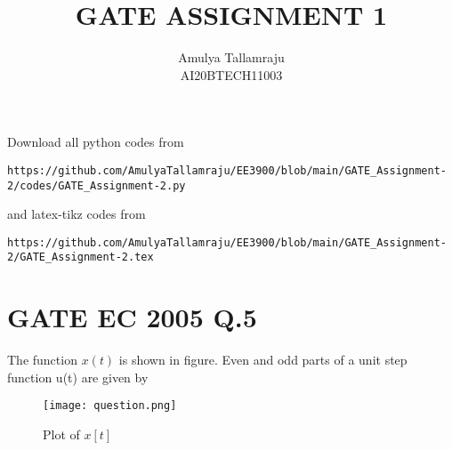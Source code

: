 \documentclass[journal,12pt,twocolumn]{IEEEtran}
\begin{document}
     \def\centbox#1{\makebox[0in]{#1}}
     \def\topbox#1{\raisebox{-\baselineskip}[0in][0in]{#1}}
     \def\midbox#1{\raisebox{-0.5\baselineskip}[0in][0in]{#1}}
\vspace{3cm}
\title{GATE ASSIGNMENT 1}
\author{Amulya Tallamraju \\ AI20BTECH11003}
\maketitle
\newpage
\bigskip
\renewcommand{\thefigure}{\theenumi}
\renewcommand{\thetable}{\theenumi}
Download all python codes from 
\begin{lstlisting}
https://github.com/AmulyaTallamraju/EE3900/blob/main/GATE_Assignment-2/codes/GATE_Assignment-2.py
\end{lstlisting}
%
and latex-tikz codes from 
%
\begin{lstlisting}
https://github.com/AmulyaTallamraju/EE3900/blob/main/GATE_Assignment-2/GATE_Assignment-2.tex
\end{lstlisting}
%
\section{GATE EC 2005 Q.5}
The function $x(t)$ is shown in figure. Even and odd parts of a unit step function u(t) are given by
\begin{figure}[!ht]
         \centering
         \texttt{[image: question.png]}
         \caption{Plot of $x[t]$}
         \label{plot}
\end{figure}
\end{document}
